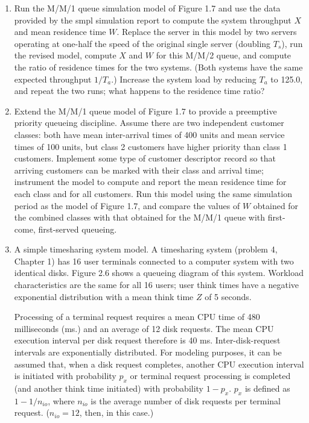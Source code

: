 \begin{enumerate}
\item Run the M/M/1 queue simulation model of Figure 1.7 and use the data
provided by the smpl simulation report to compute the system throughput $X$
and mean residence time $W$. Replace the server in this model by two servers
operating at one-half the speed of the original single server (doubling $T_s$),
run the revised model, compute $X$ and $W$ for this M/M/2 queue, and compute
the ratio of residence times for the two systems. (Both systems have the same
expected throughput $1/T_a$.) Increase the system load by reducing $T_a$ to
125.0, and repeat the two runs; what happens to the residence time ratio?

\item Extend the M/M/1 queue model of Figure 1.7 to provide a preemptive
priority queueing discipline. Assume there are two independent customer
classes: both have mean inter-arrival times of 400 units and mean service times
of 100 units, but class 2 customers have higher priority than class 1
customers. Implement some type of customer descriptor record so that arriving
customers can be marked with their class and arrival time; instrument the
model to compute and report the mean residence time for each class and for all
customers. Run this model using the same simulation period as the model of
Figure 1.7, and compare the values of $W$ obtained for the combined classes
with that obtained for the M/M/1 queue with first-come, first-served queueing.

\item A simple timesharing system model. A timesharing system (problem 4,
Chapter 1) has 16 user terminals connected to a computer system with two
identical disks. Figure 2.6 shows a queueing diagram of this system. Workload
characteristics are the same for all 16 users; user think times have a
negative exponential distribution with a mean think time $Z$ of 5 seconds.

Processing of a terminal request requires a mean CPU time of 480 milliseconds
(ms.) and an average of 12 disk requests. The mean CPU execution interval per
disk request therefore is 40 ms. Inter-disk-request intervals are
exponentially distributed. For modeling purposes, it can be assumed that, when
a disk request completes, another CPU execution interval is initiated with
probability $p_x$ or terminal request processing is completed (and another
think time initiated) with probability $1 - p_x$. $p_x$ is defined as
$1 - 1/n_{io}$, where $n_{io}$ is the average number of disk requests per
terminal request. ($n_{io} = 12$, then, in this case.)


\end{enumerate}
